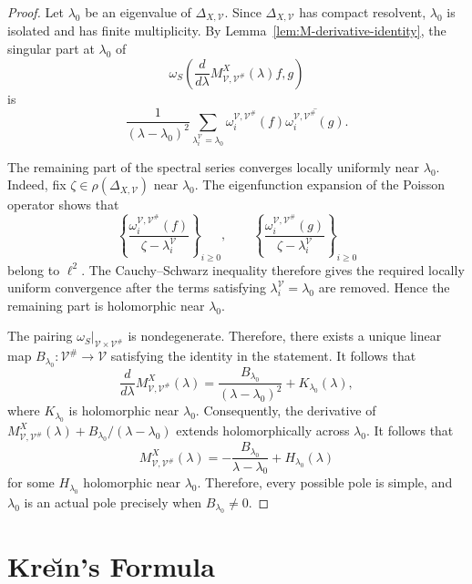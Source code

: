 \documentclass[12pt]{amsart}
\theoremstyle{plain}
\theoremstyle{definition}
\theoremstyle{remark}
\numberwithin{equation}{section} \numberwithin{figure}{section}
\renewcommand*{\to}{\rightarrow}
\begin{document}
\begin{proof}
Let \(\lambda_0\) be an eigenvalue of
\(\Delta_{X,\mathcal V}\). Since \(\Delta_{X,\mathcal V}\) has
compact resolvent, \(\lambda_0\) is isolated and has finite
multiplicity. By Lemma~\ref{lem:M-derivative-identity}, the singular
part at \(\lambda_0\) of
\[
\omega_S\left(
\frac{d}{d\lambda}
M_{\mathcal V,\mathcal V^\#}^{X}(\lambda)f,g
\right)
\]
is
\[
\frac{1}{(\lambda-\lambda_0)^2}
\sum_{\lambda_i^{\mathcal V}=\lambda_0}
\omega_i^{\mathcal V,\mathcal V^\#}(f)
\overline{\omega_i^{\mathcal V,\mathcal V^\#}(g)}.
\]

The remaining part of the spectral series converges locally
uniformly near \(\lambda_0\). Indeed, fix
\(\zeta\in\rho(\Delta_{X,\mathcal V})\) near \(\lambda_0\). The
eigenfunction expansion of the Poisson operator shows that
\[
\left\{
\frac{\omega_i^{\mathcal V,\mathcal V^\#}(f)}
{\zeta-\lambda_i^{\mathcal V}}
\right\}_{i\geq0},
\qquad
\left\{
\frac{\omega_i^{\mathcal V,\mathcal V^\#}(g)}
{\zeta-\lambda_i^{\mathcal V}}
\right\}_{i\geq0}
\]
belong to \(\ell^2\). The Cauchy--Schwarz inequality therefore gives
the required locally uniform convergence after the terms satisfying
\(\lambda_i^{\mathcal V}=\lambda_0\) are removed. Hence the
remaining part is holomorphic near \(\lambda_0\).

The pairing
\(\omega_S|_{\mathcal V\times\mathcal V^\#}\) is nondegenerate.
Therefore, there exists a unique linear map
\(B_{\lambda_0}:\mathcal V^\#\to\mathcal V\) satisfying the identity
in the statement. It follows that
\[
\frac{d}{d\lambda}
M_{\mathcal V,\mathcal V^\#}^{X}(\lambda)
=
\frac{B_{\lambda_0}}{(\lambda-\lambda_0)^2}
+
K_{\lambda_0}(\lambda),
\]
where \(K_{\lambda_0}\) is holomorphic near \(\lambda_0\).
Consequently, the derivative of
\(
M_{\mathcal V,\mathcal V^\#}^{X}(\lambda)
+B_{\lambda_0}/(\lambda-\lambda_0)
\)
extends holomorphically across \(\lambda_0\). It follows that
\[
M_{\mathcal V,\mathcal V^\#}^{X}(\lambda)
=
-\frac{B_{\lambda_0}}{\lambda-\lambda_0}
+
H_{\lambda_0}(\lambda)
\]
for some \(H_{\lambda_0}\) holomorphic near \(\lambda_0\).
Therefore, every possible pole is simple, and \(\lambda_0\) is an
actual pole precisely when \(B_{\lambda_0}\neq0\).
\end{proof}



\section{Kre\u{\i}n's Formula}
\end{document}
